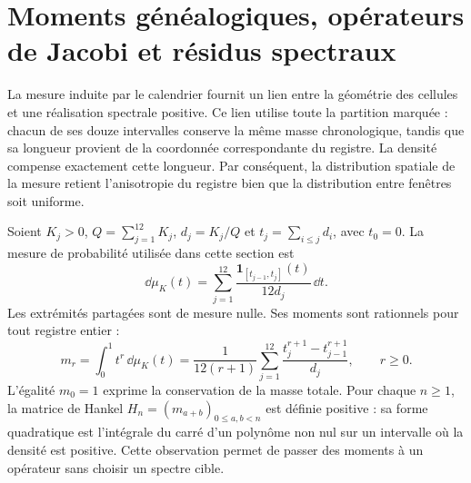 \section{Moments généalogiques, opérateurs de Jacobi et résidus spectraux}
\label{sec:jacobi-generated}

La mesure induite par le calendrier fournit un lien entre la
géométrie des cellules et une réalisation spectrale positive. Ce lien
utilise toute la partition marquée : chacun de ses douze intervalles conserve
la même masse chronologique, tandis que sa longueur provient de la coordonnée
correspondante du registre. La densité compense exactement cette
longueur. Par conséquent, la distribution spatiale de la mesure retient
l’anisotropie du registre bien que la distribution entre fenêtres soit
uniforme.

Soient \(K_j>0\), \(Q=\sum_{j=1}^{12}K_j\), \(d_j=K_j/Q\) et \(t_j=\sum_{i\leq j}d_i\), avec \(t_0=0\). La mesure de probabilité utilisée dans cette section est
\[
 \dd\mu_K(t)=\sum_{j=1}^{12}
 \frac{\mathbf1_{[t_{j-1},t_j]}(t)}{12d_j}\,\dd t.
\]
Les extrémités partagées sont de mesure nulle. Ses moments sont rationnels pour tout registre entier :
\begin{equation}
 m_r=\int_0^1t^r\,\dd\mu_K(t)
 =\frac1{12(r+1)}\sum_{j=1}^{12}
   \frac{t_j^{r+1}-t_{j-1}^{r+1}}{d_j},\qquad r\geq0.
 \label{eq:jacobi-moments}
\end{equation}
L'égalité \(m_0=1\) exprime la conservation de la masse totale. Pour chaque \(n\geq1\), la matrice de Hankel \(H_n=(m_{a+b})_{0\leq a,b<n}\) est définie positive : sa forme quadratique est l'intégrale du carré d'un polynôme non nul sur un intervalle où la densité est positive. Cette observation permet de passer des moments à un opérateur sans choisir un spectre cible.

